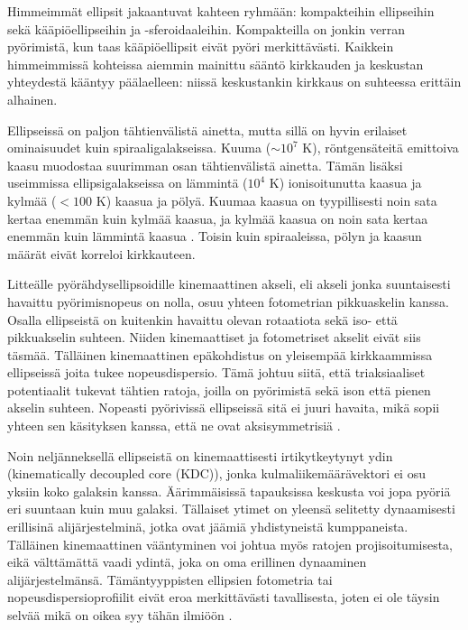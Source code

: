 \documentclass[12pt,a4paper]{article}
\begin{document}
Himmeimmät ellipsit jakaantuvat kahteen ryhmään: kompakteihin ellipseihin sekä kääpiö\-ellipseihin ja -sferoidaaleihin. Kompakteilla on jonkin verran pyörimistä, kun taas kääpiö\-ellipsit eivät pyöri merkittävästi. Kaikkein himmeimmissä kohteissa aiemmin mainittu sääntö kirkkauden ja keskustan yhteydestä kääntyy päälaelleen: niissä keskustankin kirkkaus on suhteessa erittäin alhainen.

Ellipseissä on paljon tähtienvälistä ainetta, mutta sillä on hyvin erilaiset ominaisuudet kuin spiraaligalakseissa. Kuuma ($\sim 10^7$ K), röntgensäteitä emittoiva kaasu muodostaa suurimman osan tähtienvälistä ainetta. Tämän lisäksi useimmissa ellipsigalakseissa on lämmintä ($10^4$ K) ionisoitunutta kaasua ja kylmää ($<100$ K) kaasua ja pölyä. Kuumaa kaasua on tyypillisesti noin sata kertaa enemmän kuin kylmää kaasua, ja kylmää kaasua on noin sata kertaa enemmän kuin lämmintä kaasua \citep{schweizer:1987}. Toisin kuin spiraaleissa, pölyn ja kaasun määrät eivät korreloi kirkkauteen.

Litteälle pyörähdysellipsoidille kinemaattinen akseli, eli akseli jonka suuntaisesti havaittu pyörimisnopeus on nolla, osuu yhteen fotometrian pikkuaskelin kanssa. Osalla ellipseistä on kuitenkin havaittu olevan rotaatiota sekä iso- että pikkuakselin suhteen. Niiden kinemaattiset ja fotometriset akselit eivät siis täsmää. Tälläinen kinemaattinen epäkohdistus on yleisempää kirkkaammissa ellipseissä joita tukee nopeusdispersio. Tämä johtuu siitä, että triaksiaaliset potentiaalit tukevat tähtien ratoja, joilla on pyörimistä sekä ison että pienen akselin suhteen. Nopeasti pyörivissä ellipseissä sitä ei juuri havaita, mikä sopii yhteen sen käsityksen kanssa, että ne ovat aksisymmetrisiä \citep{levison:1987, statler:1987}.
 
Noin neljänneksellä ellipseistä on kinemaattisesti irtikytkeytynyt ydin (kinematically decoupled core (KDC)), jonka kulmaliikemäärävektori ei osu yksiin koko galaksin kanssa. Äärimmäisissä tapauksissa keskusta voi jopa pyöriä eri suuntaan kuin muu galaksi. Tällaiset ytimet on yleensä selitetty dynaamisesti erillisinä alijärjestelminä, jotka ovat jäämiä yhdistyneistä kumppaneista. Tälläinen kinemaattinen vääntyminen voi johtua myös ratojen projisoitumisesta, eikä välttämättä vaadi ydintä, joka on oma erillinen dynaaminen alijärjestelmänsä. Tämäntyyppisten ellipsien fotometria tai nopeusdispersioprofiilit eivät eroa merkittävästi tavallisesta, joten ei ole täysin selvää mikä on oikea syy tähän ilmiöön \citep{statler:1991, forbes:1995, carollo:1997}.
\end{document}
